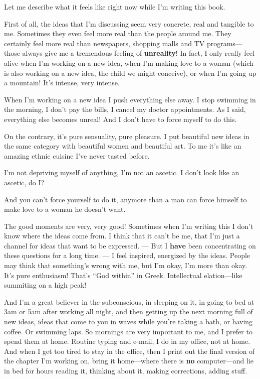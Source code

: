 \documentclass[12pt]{book}
\begin{document}
Let me describe what it feels like right now while I'm writing this book.
 
First of all, the ideas that I'm discussing seem very concrete, real and tangible to me.
Sometimes they even feel more real than the people around me.  They certainly feel
more real than newspapers, shopping malls and TV programs---those 
always give me a tremendous feeling of \textbf{unreality}!  
In fact, I only really feel alive when I'm working on a new idea, when I'm making love
to a woman (which is also working on a new idea, 
the child we might conceive), or when I'm going up a mountain!
It's intense, very intense.
 
When I'm working on a new idea I push everything else away. I stop swimming in the morning,
I don't pay the bills, I cancel my doctor appointments.
As I said, everything else becomes unreal!
And I don't have to force myself to do this.
 
On the contrary,
it's pure sensuality, pure pleasure.
I put beautiful new ideas in the same category with beautiful women and beautiful art.
To me it's like an amazing ethnic cuisine I've never tasted before.
 
I'm not depriving myself of anything, I'm not an ascetic.
I don't look like an ascetic, do I?
 
And you can't force yourself to do it, anymore than a man can force himself to make love
to a woman he doesn't want.
 
The good moments are very, very good!  Sometimes when I'm writing this I don't know
where the ideas come from. I think that it can't be me, that I'm just a channel
for ideas that want to be expressed.
--- But  
I \textbf{have} been concentrating on these questions for a long time. ---
I feel inspired, energized by the ideas.
People may think that something's wrong with me, but I'm okay, I'm more than okay.
It's pure enthusiasm! That's ``God within'' in Greek.
Intellectual elation---like summiting on a high peak!
 
And I'm a great believer in the subconscious, in sleeping on it, in going to bed at 3am
or 5am
after working all night, and then getting up the next morning full of new ideas, ideas that come
to you in waves while you're taking a bath, or having coffee.
Or swimming laps.
So mornings are very important to me, and I prefer to spend them at home.  
Routine typing and e-mail, I do in my office, not at home.
And when I get too tired to stay in the office, then I print out the
final version of the chapter I'm working on, bring it home---where there is \textbf{no}
computer---and lie in bed for hours reading it, thinking about it, making corrections,
adding stuff.
 
\end{document}
